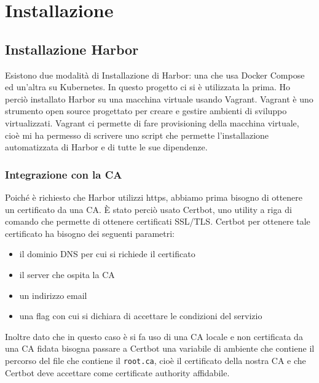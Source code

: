 \documentclass[12pt,a4paper]{report}
\begin{document}
\chapter{Installazione}
\section{Installazione Harbor}
Esistono due modalità di Installazione di Harbor: una che usa Docker Compose ed un'altra su Kubernetes. In questo progetto ci si è utilizzata la prima. Ho perciò installato Harbor su una macchina virtuale usando Vagrant. Vagrant è uno strumento open source progettato per creare e gestire ambienti di sviluppo virtualizzati. Vagrant ci permette di fare provisioning della macchina virtuale, cioè mi ha permesso di scrivere uno script che permette l'installazione automatizzata di Harbor e di tutte le sue dipendenze.
\subsection{Integrazione con la CA}
Poiché è richiesto che Harbor utilizzi https, abbiamo prima bisogno di ottenere un certificato da una CA. È stato perciò usato Certbot, uno utility a riga di comando che permette di ottenere certificati SSL/TLS. Certbot per ottenere tale certificato ha bisogno dei seguenti parametri:
\begin{itemize}
    \item il dominio DNS per cui si richiede il certificato
    \item il server che ospita la CA
    \item un indirizzo email
    \item una flag con cui si dichiara di accettare le condizioni del servizio
\end{itemize}
Inoltre dato che in questo caso è si fa uso di una CA locale e non certificata da una CA fidata bisogna passare a Certbot una variabile di ambiente che contiene il percorso del file che contiene il \texttt{root.ca}, cioè il certificato della nostra CA e che Certbot deve accettare come certificate authority affidabile.
\end{document}
